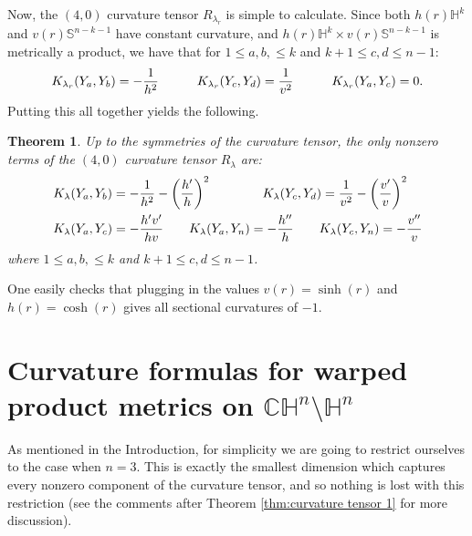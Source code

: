 \documentclass[10pt]{amsart}
\def\l{\lambda}
\def\S{\mathcal{S}}
\def\H{\mathbb{H}}
\def\C{\mathbb{C}}
\def\S{\mathbb{S}}
\newtheorem{theorem}{Theorem}[section]
\theoremstyle{definition}
\theoremstyle{remark}
\numberwithin{equation}{section}
\begin{document}
Now, the $(4,0)$ curvature tensor $R_{\l_r}$ is simple to calculate.  
Since both $h(r) \H^k$ and $v(r) \S^{n-k-1}$ have constant curvature, and $h(r) \H^k \times v(r) \S^{n-k-1}$ is metrically a product, we have that for $1 \leq a, b, \leq k$ and $k+1 \leq c, d \leq n-1$:
	\begin{align*}
	K_{\l_r} (Y_a,Y_b) = - \frac{1}{h^2} \hskip 30pt K_{\l_r}(Y_c,Y_d) = \frac{1}{v^2} \hskip 30pt K_{\l_r}(Y_a,Y_c) = 0.
	\end{align*}
Putting this all together yields the following.

\vskip 20pt

\begin{theorem}\label{thm:curvature tensor 0}
Up to the symmetries of the curvature tensor, the only nonzero terms of the $(4,0)$ curvature tensor $R_\l$ are:
	\begin{align*}
	&K_\l (Y_a,Y_b) = - \frac{1}{h^2} - \left( \frac{h'}{h} \right)^2    \hskip 40pt  K_\l (Y_c,Y_d) = \frac{1}{v^2} - \left( \frac{v'}{v} \right)^2   \\
	&K_\l (Y_a,Y_c) = - \frac{h'v'}{hv}    \hskip 20pt  K_\l (Y_a,Y_n) = - \frac{h''}{h}  \hskip 20pt   K_\l(Y_c,Y_n) = - \frac{v''}{v}
	\end{align*}
where $1 \leq a, b, \leq k$ and $k+1 \leq c, d \leq n-1$.
\end{theorem}

\vskip 10pt

One easily checks that plugging in the values $v(r) = \sinh(r)$ and $h(r) = \cosh(r)$ gives all sectional curvatures of $-1$.  














\vskip 20pt

\section{Curvature formulas for warped product metrics on $\C \H^n \setminus \H^n$}\label{section:chn/hn}
As mentioned in the Introduction, for simplicity we are going to restrict ourselves to the case when $n=3$.  
This is exactly the smallest dimension which captures every nonzero component of the curvature tensor, and so nothing is lost with this restriction (see the comments after Theorem \ref{thm:curvature tensor 1} for more discussion).
\end{document}
